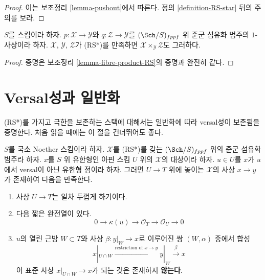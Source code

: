 \begin{proof}
이는 보조정리 \ref{lemma-pushout}에서 따른다.
정의 \ref{definition-RS-star} 뒤의 주의를 보라.
\end{proof}

\begin{lemma}
\label{lemma-fibre-product-RS-star}
$S$를 스킴이라 하자. $p : \mathcal{X} \to \mathcal{Y}$와
$q : \mathcal{Z} \to \mathcal{Y}$를 $(\Sch/S)_{fppf}$ 위 준군 섬유화
범주의 $1$-사상이라 하자. $\mathcal{X}$, $\mathcal{Y}$, $\mathcal{Z}$가
(RS*)를 만족하면 $\mathcal{X} \times_\mathcal{Y} \mathcal{Z}$도 그러하다.
\end{lemma}

\begin{proof}
증명은 보조정리 \ref{lemma-fibre-product-RS}의 증명과 완전히 같다.
\end{proof}








\section{Versal성과 일반화}
\label{section-generalize-versality}

\noindent
(RS*)를 가지고 극한을 보존하는 스택에 대해서는 일반화에 따라
versal성이 보존됨을 증명한다. 처음 읽을 때에는 이 절을 건너뛰어도 좋다.

\begin{lemma}
\label{lemma-single-point}
$S$를 국소 Noether 스킴이라 하자. $\mathcal{X}$를 (RS*)를 갖는
$(\Sch/S)_{fppf}$ 위의 준군 섬유화 범주라 하자.
$x$를 $S$ 위 유한형인 아핀 스킴 $U$ 위의 $\mathcal{X}$의 대상이라 하자.
$u \in U$를 $x$가 $u$에서 versal이 아닌 유한형 점이라 하자.
그러면 $U \to T$ 위에 놓이는 $\mathcal{X}$의 사상 $x \to y$가
존재하여 다음을 만족한다.
\begin{enumerate}
\item 사상 $U \to T$는 일차 두껍게 하기이다.
\item 다음 짧은 완전열이 있다.
$$
0 \to \kappa(u) \to \mathcal{O}_T \to \mathcal{O}_U \to 0
$$
\item $u$의 열린 근방 $W \subset T$와 사상 $\beta : y|_W \to x$로
이루어진 쌍 $(W, \alpha)$ 중에서 합성
$$
x|_{U \cap W} \xrightarrow{\text{restriction of }x \to y}
y|_W \xrightarrow{\beta} x
$$
이 표준 사상 $x|_{U \cap W} \to x$가 되는 것은 존재하지 {\bf 않는다}.
\end{enumerate}
\end{lemma}

